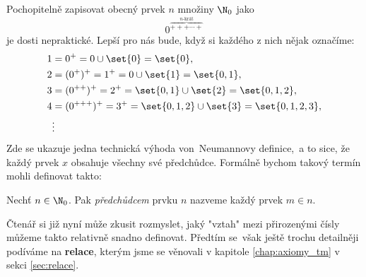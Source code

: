 Pochopitelně zapisovat obecný prvek $n$ množiny $\N_0$ jako
\begin{equation*}
    0^{\overbrace{+++\cdots+}^{n\text{-krát}}}
\end{equation*}
je dosti nepraktické. Lepší pro nás bude, když si každého z nich nějak označíme:
\begin{align*}
    1&=0^+=0\cup\set{0}=\set{0},\\
    2&=(0^+)^+=1^+=0\cup\set{1}=\set{0,1},\\
    3&=(0^{++})^+=2^+=\set{0,1}\cup\set{2}=\set{0,1,2},\\
    4&=(0^{+++})^+=3^+=\set{0,1,2}\cup\set{3}=\set{0,1,2,3},\\
    &\vdots
\end{align*}
Zde se ukazuje jedna technická výhoda von~Neumannovy definice,~a to sice, že každý prvek $x$ obsahuje všechny své předchůdce. Formálně bychom takový termín mohli definovat takto:
\begin{definition}[Předchůdce]\label{def:predchudce}
    Nechť $n\in\N_0$. Pak \emph{předchůdcem} prvku $n$ nazveme každý prvek $m\in n$.
\end{definition}
Čtenář si již nyní může zkusit rozmyslet, jaký "vztah" mezi přirozenými čísly můžeme takto relativně snadno definovat. Předtím se~však ještě trochu detailněji podíváme na \textbf{relace}, kterým jsme se věnovali v kapitole \ref{chap:axiomy_tm} v sekci \ref{sec:relace}.